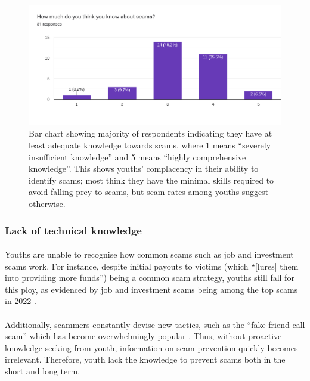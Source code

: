\documentclass[a4paper]{article}
\begin{document}
\begin{figure}[ht]
  \centering \includegraphics[width=\textwidth]{scamknowledgegraph}
  \caption{Bar chart showing majority of respondents indicating they have at
    least adequate knowledge towards scams, where 1 means ``severely
    insufficient knowledge'' and 5 means ``highly comprehensive knowledge''.
    This shows youths' complacency in their ability to identify scams; most
    think they have the minimal skills required to avoid falling prey to scams,
    but scam rates among youths suggest
    otherwise.}\label{fig:scamknowledgegraph}
\end{figure}


\subsubsection{Lack of technical knowledge}
\paragraph{} Youths are unable to recognise how common scams such as job and
investment scams work. For instance, despite initial payouts to victims (which
``[lures] them into providing more funds'') being a common scam strategy, youths
still fall for this ploy, as evidenced by job and investment scams being among
the top scams in 2022 \parencite{Hui.2023}.

\paragraph{} Additionally, scammers constantly devise new tactics, such as the
``fake friend call scam'' which has become overwhelmingly popular
\parencite{Goddard.2023}. Thus, without proactive knowledge-seeking from youth,
information on scam prevention quickly becomes irrelevant. Therefore, youth lack
the knowledge to prevent scams both in the short and long term.
\end{document}
